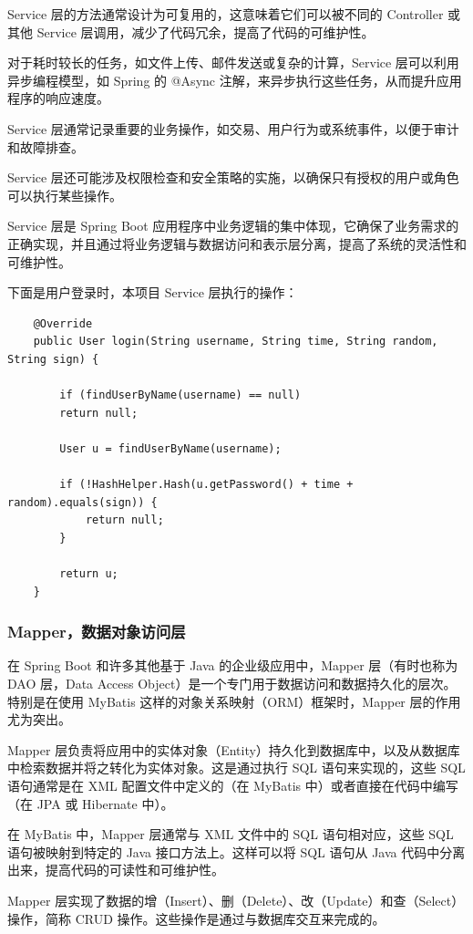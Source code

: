 \documentclass{base}
\begin{document}
Service 层的方法通常设计为可复用的，这意味着它们可以被不同的 Controller 或其他 Service 层调用，减少了代码冗余，提高了代码的可维护性。

对于耗时较长的任务，如文件上传、邮件发送或复杂的计算，Service 层可以利用异步编程模型，如 Spring 的 @Async 注解，来异步执行这些任务，从而提升应用程序的响应速度。

Service 层通常记录重要的业务操作，如交易、用户行为或系统事件，以便于审计和故障排查。

Service 层还可能涉及权限检查和安全策略的实施，以确保只有授权的用户或角色可以执行某些操作。

Service 层是 Spring Boot 应用程序中业务逻辑的集中体现，它确保了业务需求的正确实现，并且通过将业务逻辑与数据访问和表示层分离，提高了系统的灵活性和可维护性。

下面是用户登录时，本项目 Service 层执行的操作：
\begin{verbatim}
	@Override
	public User login(String username, String time, String random, String sign) {
		
		if (findUserByName(username) == null)
		return null;
		
		User u = findUserByName(username);
		
		if (!HashHelper.Hash(u.getPassword() + time + random).equals(sign)) {
			return null;
		}
		
		return u;
	}
\end{verbatim}

\subsubsection{Mapper，数据对象访问层}

在 Spring Boot 和许多其他基于 Java 的企业级应用中，Mapper 层（有时也称为 DAO 层，Data Access Object）是一个专门用于数据访问和数据持久化的层次。特别是在使用 MyBatis 这样的对象关系映射（ORM）框架时，Mapper 层的作用尤为突出。

Mapper 层负责将应用中的实体对象（Entity）持久化到数据库中，以及从数据库中检索数据并将之转化为实体对象。这是通过执行 SQL 语句来实现的，这些 SQL 语句通常是在 XML 配置文件中定义的（在 MyBatis 中）或者直接在代码中编写（在 JPA 或 Hibernate 中）。

在 MyBatis 中，Mapper 层通常与 XML 文件中的 SQL 语句相对应，这些 SQL 语句被映射到特定的 Java 接口方法上。这样可以将 SQL 语句从 Java 代码中分离出来，提高代码的可读性和可维护性。

Mapper 层实现了数据的增（Insert）、删（Delete）、改（Update）和查（Select）操作，简称 CRUD 操作。这些操作是通过与数据库交互来完成的。
\end{document}
